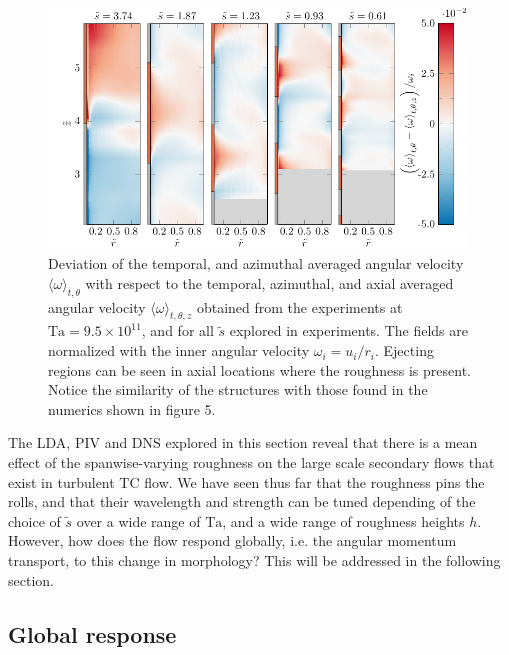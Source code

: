 \begin{figure}
\centering
\includegraphics[width=0.99\textwidth]{fig5_omegafluc.pdf}
\caption{Deviation of the temporal, and azimuthal averaged angular velocity $\langle \omega \rangle_{t,\theta}$ with respect to the temporal, azimuthal, and axial averaged angular velocity $\langle \omega \rangle_{t,\theta,z}$ obtained from the experiments at $\text{Ta}=9.5\times 10^{11}$, and for all $\tilde{s}$ explored in experiments. The fields are normalized with the inner angular velocity $\omega_i=u_i/r_i$. Ejecting regions can be seen in axial locations where the roughness is present. Notice the similarity of the structures with those found in the numerics shown in figure 5. }
\label{fig:pivomega}
\end{figure}

The LDA, PIV and DNS explored in this section reveal that there is a mean effect of the spanwise-varying roughness on the large scale secondary flows that exist in turbulent TC flow. We have seen thus far that the roughness pins the rolls, and that their wavelength and strength can be tuned depending of the choice of $\tilde{s}$ over a wide range of $\text{Ta}$, and a wide range of roughness heights $h$. However, how does the flow respond globally, i.e. the angular momentum transport, to this change in morphology? This will be addressed in the following section.

\subsection{Global response}
\label{sec:resultglob}

